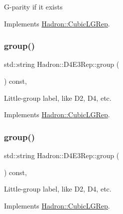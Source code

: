 G-\/parity if it exists 

Implements \mbox{\hyperlink{structHadron_1_1CubicLGRep_ace26f7b2d55e3a668a14cb9026da5231}{Hadron\+::\+Cubic\+L\+G\+Rep}}.

\mbox{\label{structHadron_1_1D4E3Rep_a5bae515c0b50b8f5e96c3d42b8f32f4d}} 
\subsubsection{\texorpdfstring{group()}{group()}\hspace{0.1cm}{\footnotesize\ttfamily [1/3]}}
{\footnotesize\ttfamily std\+::string Hadron\+::\+D4\+E3\+Rep\+::group (\begin{DoxyParamCaption}{ }\end{DoxyParamCaption}) const\hspace{0.3cm}{\ttfamily [inline]}, {\ttfamily [virtual]}}

Little-\/group label, like D2, D4, etc. 

Implements \mbox{\hyperlink{structHadron_1_1CubicLGRep_a9bdb14b519a611d21379ed96a3a9eb41}{Hadron\+::\+Cubic\+L\+G\+Rep}}.

\mbox{\label{structHadron_1_1D4E3Rep_a5bae515c0b50b8f5e96c3d42b8f32f4d}} 
\subsubsection{\texorpdfstring{group()}{group()}\hspace{0.1cm}{\footnotesize\ttfamily [2/3]}}
{\footnotesize\ttfamily std\+::string Hadron\+::\+D4\+E3\+Rep\+::group (\begin{DoxyParamCaption}{ }\end{DoxyParamCaption}) const\hspace{0.3cm}{\ttfamily [inline]}, {\ttfamily [virtual]}}

Little-\/group label, like D2, D4, etc. 

Implements \mbox{\hyperlink{structHadron_1_1CubicLGRep_a9bdb14b519a611d21379ed96a3a9eb41}{Hadron\+::\+Cubic\+L\+G\+Rep}}.

\mbox{\label{structHadron_1_1D4E3Rep_a5bae515c0b50b8f5e96c3d42b8f32f4d}} 
